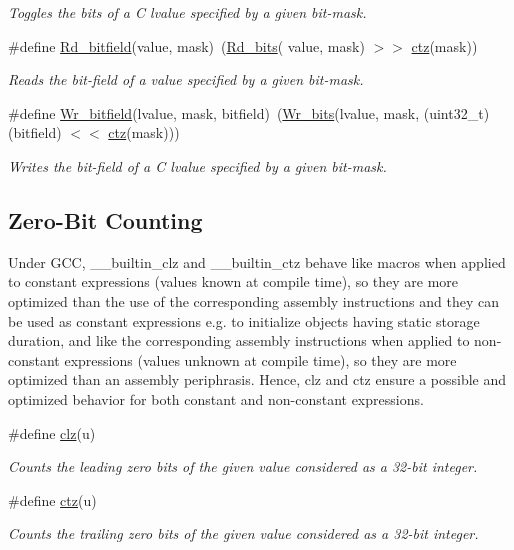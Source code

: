 \begin{DoxyCompactItemize}
\begin{DoxyCompactList}\small\item\em Toggles the bits of a C lvalue specified by a given bit-\/mask. \end{DoxyCompactList}\item 
\#define \hyperlink{group__group__sam0__utils_gaa7ee388a5bd843e5e0ba3d194bc1d8a4}{Rd\+\_\+bitfield}(value,  mask)~(\hyperlink{group__group__sam0__utils_ga53d9294b7065346ffa04d7991d2bc31e}{Rd\+\_\+bits}( value, mask) $>$$>$ \hyperlink{group__group__sam0__utils_gab069bfec305db5213465d3b689836404}{ctz}(mask))
\begin{DoxyCompactList}\small\item\em Reads the bit-\/field of a value specified by a given bit-\/mask. \end{DoxyCompactList}\item 
\#define \hyperlink{group__group__sam0__utils_gaa2ede64db1455ec339cd8a3303647644}{Wr\+\_\+bitfield}(lvalue,  mask,  bitfield)~(\hyperlink{group__group__sam0__utils_ga97b2bc0b5cdc7ec5293b7a5304cee0f0}{Wr\+\_\+bits}(lvalue, mask, (uint32\+\_\+t)(bitfield) $<$$<$ \hyperlink{group__group__sam0__utils_gab069bfec305db5213465d3b689836404}{ctz}(mask)))
\begin{DoxyCompactList}\small\item\em Writes the bit-\/field of a C lvalue specified by a given bit-\/mask. \end{DoxyCompactList}\end{DoxyCompactItemize}
\subsection*{Zero-\/\+Bit Counting}
\label{_amgrpd7e64f1bf7ad6347e17b23a92fc56d83}%
Under G\+C\+C, \+\_\+\+\_\+builtin\+\_\+clz and \+\_\+\+\_\+builtin\+\_\+ctz behave like macros when applied to constant expressions (values known at compile time), so they are more optimized than the use of the corresponding assembly instructions and they can be used as constant expressions e.\+g. to initialize objects having static storage duration, and like the corresponding assembly instructions when applied to non-\/constant expressions (values unknown at compile time), so they are more optimized than an assembly periphrasis. Hence, clz and ctz ensure a possible and optimized behavior for both constant and non-\/constant expressions. \begin{DoxyCompactItemize}
\item 
\#define \hyperlink{group__group__sam0__utils_ga004f88903a09b9c23017e697eaf5a845}{clz}(u)
\begin{DoxyCompactList}\small\item\em Counts the leading zero bits of the given value considered as a 32-\/bit integer. \end{DoxyCompactList}\item 
\#define \hyperlink{group__group__sam0__utils_gab069bfec305db5213465d3b689836404}{ctz}(u)
\begin{DoxyCompactList}\small\item\em Counts the trailing zero bits of the given value considered as a 32-\/bit integer. \end{DoxyCompactList}\end{DoxyCompactItemize}
